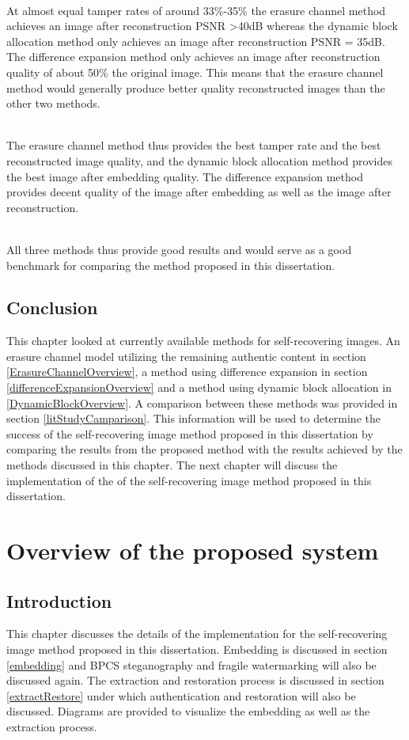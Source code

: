 \documentclass[12pt]{article}
\begin{document}
\hspace{0pt} \\
At almost equal tamper rates of around 33\%-35\% the erasure channel method achieves an image after reconstruction PSNR \textgreater 40dB whereas the dynamic block allocation method only achieves an image after reconstruction PSNR = 35dB.
The difference expansion method only achieves an image after reconstruction quality of about 50\% the original image.
This means that the erasure channel method would generally produce better quality reconstructed images than the other two methods.

\hspace{0pt} \\
The erasure channel method thus provides the best tamper rate and the best reconstructed image quality, and the dynamic block allocation method provides the best image after embedding quality.
The difference expansion method provides decent quality of the image after embedding as well as the image after reconstruction.

\hspace{0pt} \\
All three methods thus provide good results and would serve as a good benchmark for comparing the method proposed in this dissertation.

\subsection{Conclusion}
This chapter looked at currently available methods for self-recovering images.
An erasure channel model utilizing the remaining authentic content in section \ref{ErasureChannelOverview}, a method using difference expansion in section \ref{differenceExpansionOverview} and a method using dynamic block allocation in \ref{DynamicBlockOverview}.
A comparison between these methods was provided in section \ref{litStudyCamparison}.
This information will be used to determine the success of the self-recovering image method proposed in this dissertation by comparing the results from the proposed method with the results achieved by the methods discussed in this chapter.
The next chapter will discuss the implementation of the of the self-recovering image method proposed in this dissertation.  

\section{Overview of the proposed system}
\label{Implementation}
\subsection{Introduction}
This chapter discusses the details of the implementation for the self-recovering image method proposed in this dissertation. Embedding is discussed in section \ref{embedding} and BPCS steganography and fragile watermarking will also be discussed again.
The extraction and restoration process is discussed in section \ref{extractRestore} under which authentication and restoration will also be discussed.
Diagrams are provided to visualize the embedding as well as the extraction process.
\end{document}
